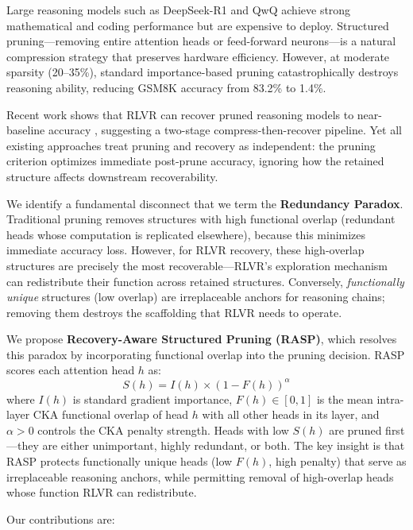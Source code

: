 \documentclass[11pt]{article}
\begin{document}
Large reasoning models such as DeepSeek-R1 \citep{deepseek2025r1} and QwQ \citep{qwen2025qwq} achieve strong mathematical and coding performance but are expensive to deploy.
Structured pruning---removing entire attention heads or feed-forward neurons---is a natural compression strategy that preserves hardware efficiency.
However, at moderate sparsity (20--35\%), standard importance-based pruning catastrophically destroys reasoning ability, reducing GSM8K accuracy from 83.2\% to 1.4\%.

Recent work shows that RLVR can recover pruned reasoning models to near-baseline accuracy \citep{selfhealing2025}, suggesting a two-stage compress-then-recover pipeline.
Yet all existing approaches treat pruning and recovery as independent: the pruning criterion optimizes immediate post-prune accuracy, ignoring how the retained structure affects downstream recoverability.

We identify a fundamental disconnect that we term the \textbf{Redundancy Paradox}.
Traditional pruning removes structures with high functional overlap (redundant heads whose computation is replicated elsewhere), because this minimizes immediate accuracy loss.
However, for RLVR recovery, these high-overlap structures are precisely the most recoverable---RLVR's exploration mechanism can redistribute their function across retained structures.
Conversely, \emph{functionally unique} structures (low overlap) are irreplaceable anchors for reasoning chains; removing them destroys the scaffolding that RLVR needs to operate.

We propose \textbf{Recovery-Aware Structured Pruning (RASP)}, which resolves this paradox by incorporating functional overlap into the pruning decision.
RASP scores each attention head $h$ as:
\begin{equation}
S(h) = I(h) \times (1 - F(h))^\alpha
\label{eq:rasp_score}
\end{equation}
where $I(h)$ is standard gradient importance, $F(h) \in [0,1]$ is the mean intra-layer CKA functional overlap of head $h$ with all other heads in its layer, and $\alpha > 0$ controls the CKA penalty strength.
Heads with low $S(h)$ are pruned first---they are either unimportant, highly redundant, or both.
The key insight is that RASP protects functionally unique heads (low $F(h)$, high penalty) that serve as irreplaceable reasoning anchors, while permitting removal of high-overlap heads whose function RLVR can redistribute.

Our contributions are:
\end{document}
